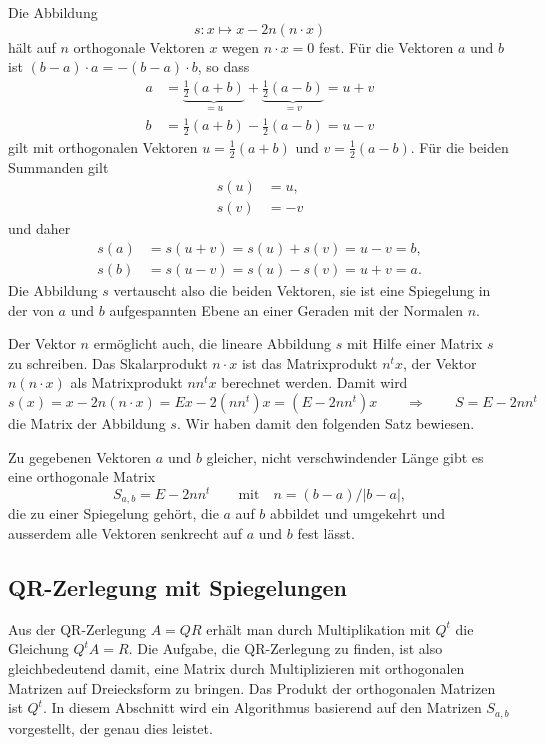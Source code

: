 Die Abbildung
\[
s:
x\mapsto  x - 2 n(n\cdot x) 
\]
hält auf $n$ orthogonale Vektoren $x$ wegen $n\cdot x=0$ fest.
Für die Vektoren $a$ und $b$ ist $(b-a)\cdot a= -(b-a)\cdot b$, so
dass
\begin{align*}
a
&=
\underbrace{\frac12(a+b)}_{\displaystyle =u}
+
\underbrace{\frac12(a-b)}_{\displaystyle=v}
=
u+v
\\
b&= \frac12(a+b) - \frac12(a-b) = u - v
\end{align*}
gilt mit orthogonalen Vektoren $u=\frac12(a+b)$ und $v=\frac12(a-b)$.
Für die beiden Summanden gilt
\begin{align*}
s(u) &= u,\\
s(v) &= -v
\end{align*}
und daher
\begin{align*}
s(a)
&=
s(u+v)=s(u)+s(v)=u-v = b,
\\
s(b)
&=
s(u-v)=s(u)-s(v)=u+v = a.
\end{align*}
Die Abbildung $s$ vertauscht also die beiden Vektoren, sie ist eine
Spiegelung in der von $a$ und $b$ aufgespannten Ebene an einer
Geraden mit der Normalen $n$.

Der Vektor $n$ ermöglicht auch, die lineare Abbildung $s$ mit Hilfe
einer Matrix $s$ zu schreiben.
Das Skalarprodukt $n\cdot x$ ist das Matrixprodukt $n^t x$, der Vektor
$n(n\cdot x)$ als Matrixprodukt $nn^tx$ berechnet werden. 
Damit wird 
\[
s(x)
=
x - 2n(n\cdot x)
=
Ex - 2(nn^t) x
=
(E-2nn^t) x
\qquad\Rightarrow\qquad
S=E-2nn^t
\]
die Matrix der Abbildung $s$.
Wir haben damit den folgenden Satz bewiesen.

\begin{satz}
\label{buch:satz:sab}
Zu gegebenen Vektoren $a$ und $b$ gleicher, nicht verschwindender
Länge gibt es eine orthogonale Matrix
\[
S_{a,b} = E-2nn^t\qquad \text{mit}\quad n = (b-a)/|b-a|,
\]
die zu einer Spiegelung gehört, die $a$ auf $b$ abbildet und
umgekehrt  und ausserdem alle Vektoren senkrecht auf $a$ und $b$ fest lässt.
\end{satz}
%

%
%
\subsection{QR-Zerlegung mit Spiegelungen
\label{buch:subsection:qrspiegelungen}}
Aus der QR-Zerlegung $A=QR$ erhält man durch Multiplikation mit $Q^t$
die Gleichung $Q^tA=R$.
Die Aufgabe, die QR-Zerlegung zu finden, ist also gleichbedeutend damit,
eine Matrix durch Multiplizieren mit orthogonalen Matrizen auf Dreiecksform
zu bringen.
%
Das Produkt der orthogonalen Matrizen ist $Q^t$.
In diesem Abschnitt wird ein Algorithmus basierend auf den Matrizen
$S_{a,b}$ vorgestellt, der genau dies leistet.

